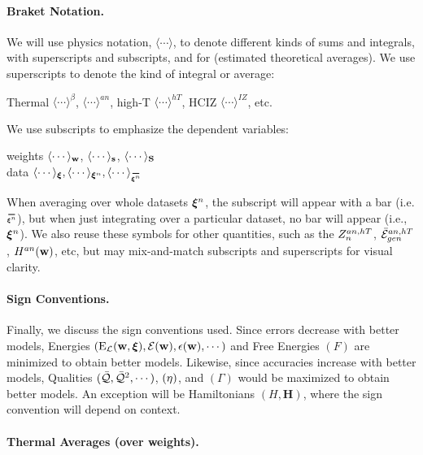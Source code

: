 \paragraph{Braket Notation.}
We will use physics \BraKet notation, $\langle\cdots\rangle$,
to denote different kinds of sums and integrals, with superscripts and subscripts,
and for \ExpectedValues (estimated theoretical averages).
We use superscripts to denote the kind of integral or average:
\begin{center}
Thermal $\langle\cdots\rangle^{\beta}$,
\Annealed $\langle\cdots\rangle^{an}$,
high-T $\langle\cdots\rangle^{hT}$,
HCIZ $\langle\cdots\rangle^{IZ}$, etc.
\end{center}
We use subscripts to emphasize the dependent variables:
\begin{center}
  weights $\langle\cdots\rangle_{{\mathbf{w}}}$, $\langle\cdots\rangle_{{\mathbf{s}}}$, $\langle\cdots\rangle_{{\mathbf{S}}}$ \nonumber \\
    \vspace{0.33cm}  %
data $\langle\cdots\rangle_{\XI},
\langle\cdots\rangle_{\NDXI},
\langle\cdots\rangle_{\AVGNDXI}$
\end{center}
When averaging over whole datasets $\boldsymbol{\xi}^{n}$, the subscript will appear with a bar (i.e. $\AVGNDXIn$), but when just integrating over a particular dataset, no bar will appear (i.e., $\boldsymbol{\xi}^{n}$). 
We also reuse these symbols for other quantities, such as the $Z^{an,hT}_{n}$, $\bar{\mathcal{E}}_{gen}^{an,hT}$, $H^{an}({\mathbf{w}})$, etc,
but may mix-and-match subscripts and superscripts for visual clarity.

\paragraph{Sign Conventions.}
Finally, we discuss the sign conventions used.  Since errors decrease with better models,
Energies $(\mathrm{E}_{\mathcal{L}}(\mathbf{w},\boldsymbol{\xi}), \mathcal{E}(\mathbf{w}), \epsilon({\mathbf{w}}), \cdots)$ and Free Energies $(F)$ are minimized to obtain better models.
Likewise, since accuracies increase with better models, Qualities $(\bar{\mathcal{Q}}, \bar{\mathcal{Q}}^{2}, \cdots)$,
\SelfOverlap $(\eta)$, and \Quality \GeneratingFunction $(\Gamma)$ would be maximized to obtain better models.
An exception will be Hamiltonians $(H,\mathbf{H})$, where the sign convention will depend on context.

\paragraph{Thermal Averages (over weights).}

